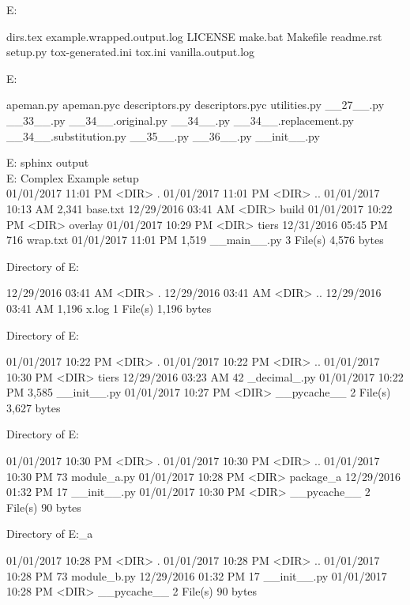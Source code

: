 E:\Python\apeman

dirs.tex
example.wrapped.output.log
LICENSE
make.bat
Makefile
readme.rst
setup.py
tox-generated.ini
tox.ini
vanilla.output.log

E:\Python\apeman\apeman

apeman.py
apeman.pyc
descriptors.py
descriptors.pyc
utilities.py
__27__.py
__33__.py
__34__.original.py
__34__.py
__34__.replacement.py
__34__.substitution.py
__35__.py
__36__.py
__init__.py

E:\Python\apeman\build   \> sphinx output         \\
E:\Python\apeman\complex \> Complex Example setup \\

01/01/2017  11:01 PM    <DIR>          .
01/01/2017  11:01 PM    <DIR>          ..
01/01/2017  10:13 AM             2,341 base.txt
12/29/2016  03:41 AM    <DIR>          build
01/01/2017  10:22 PM    <DIR>          overlay
01/01/2017  10:29 PM    <DIR>          tiers
12/31/2016  05:45 PM               716 wrap.txt
01/01/2017  11:01 PM             1,519 __main__.py
               3 File(s)          4,576 bytes

 Directory of E:\Python\apeman\complex\build

12/29/2016  03:41 AM    <DIR>          .
12/29/2016  03:41 AM    <DIR>          ..
12/29/2016  03:41 AM             1,196 x.log
               1 File(s)          1,196 bytes

 Directory of E:\Python\apeman\complex\overlay

01/01/2017  10:22 PM    <DIR>          .
01/01/2017  10:22 PM    <DIR>          ..
01/01/2017  10:30 PM    <DIR>          tiers
12/29/2016  03:23 AM                42 _decimal_.py
01/01/2017  10:22 PM             3,585 __init__.py
01/01/2017  10:27 PM    <DIR>          __pycache__
               2 File(s)          3,627 bytes

 Directory of E:\Python\apeman\complex\overlay\tiers

01/01/2017  10:30 PM    <DIR>          .
01/01/2017  10:30 PM    <DIR>          ..
01/01/2017  10:30 PM                73 module_a.py
01/01/2017  10:28 PM    <DIR>          package_a
12/29/2016  01:32 PM                17 __init__.py
01/01/2017  10:30 PM    <DIR>          __pycache__
               2 File(s)             90 bytes

 Directory of E:\Python\apeman\complex\overlay\tiers\package_a

01/01/2017  10:28 PM    <DIR>          .
01/01/2017  10:28 PM    <DIR>          ..
01/01/2017  10:28 PM                73 module_b.py
12/29/2016  01:32 PM                17 __init__.py
01/01/2017  10:28 PM    <DIR>          __pycache__
               2 File(s)             90 bytes

